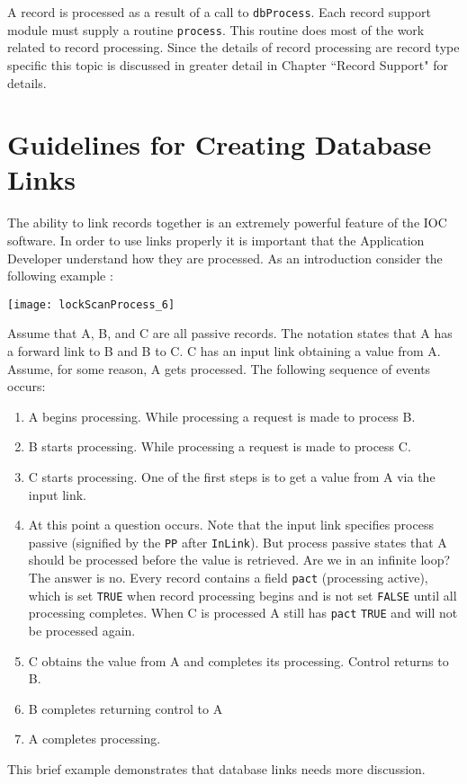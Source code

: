 A record is processed as a result of a call to \verb|dbProcess|. Each record support module must supply a routine \verb|process|. 
This routine does most of the work related to record processing. Since the details of record processing are record type 
specific this topic is discussed in greater detail in Chapter ``Record Support" for details.

\section{Guidelines for Creating Database Links}

The ability to link records together is an extremely powerful feature of the IOC software. In order to use links properly it 
is important that the Application Developer understand how they are processed. As an introduction consider the following 
example :

\begin{center}
\texttt{[image: lockScanProcess\_6]}
\end{center}

Assume that A, B, and C are all passive records. The notation states that A has a forward link to B and B to C. C has an 
input link obtaining a value from A. Assume, for some reason, A gets processed. The following sequence of events 
occurs:

\begin{enumerate}\item A begins processing. While processing a request is made to process B.

\item B starts processing. While processing a request is made to process C.

\item C starts processing. One of the first steps is to get a value from A via the input link.

\item At this point a question occurs. Note that the input link specifies process passive (signified by the \verb|PP| after 
\verb|InLink|). But process passive states that A should be processed before the value is retrieved. Are we in an infinite 
loop? The answer is no. Every record contains a field \verb|pact| (processing active), which is set \verb|TRUE| when record 
processing begins and is not set \verb|FALSE| until all processing completes. When C is processed A still has \verb|pact| \verb|TRUE| 
and will not be processed again.

\item C obtains the value from A and completes its processing. Control returns to B.

\item B completes returning control to A

\item A completes processing.

\end{enumerate}This brief example demonstrates that database links needs more discussion.

